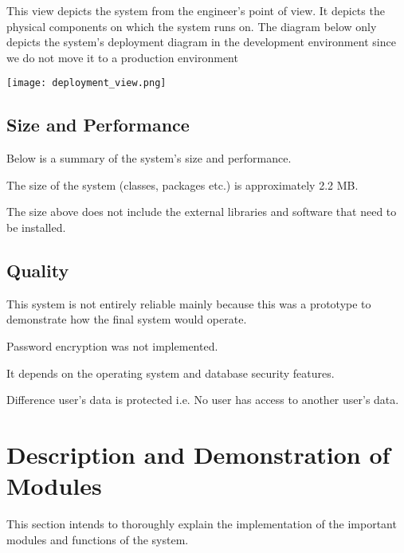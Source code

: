\documentclass[10pt]{article}
\begin{document}
This view depicts the system from the engineer’s point of view. It depicts the physical components on which the system runs on. The diagram below only depicts the system’s deployment diagram in the development environment since we do not move it to a production environment

\begin{center}
\texttt{[image: deployment\_view.png]}
\end{center}


\subsection{Size and Performance}

Below is a summary of the system’s size and performance.

\begin{description}[font=$\bullet$~\normalfont\scshape\color{red!50!black}]
\item[] The size of the system (classes, packages etc.) is approximately 2.2 MB.
\item[] The size above does not include the external libraries and software that need to be installed.
\end{description}


\subsection{Quality}

This system is not entirely reliable mainly because this was a prototype to demonstrate how the final system would operate. 

\begin{description}[font=$\bullet$~\normalfont\scshape\color{red!50!black}]
\item[] Password encryption was not implemented.
\item[] It depends on the operating system and database security features.
\item[] Difference user’s data is protected i.e. No user has access to another user’s data.
\end{description}

\section{Description and Demonstration of Modules}
This section intends to thoroughly explain the implementation of the important modules and functions of the system.
\end{document}
